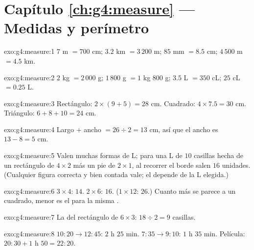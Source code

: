 \section*{Capítulo \ref{ch:g4:measure} --- Medidas y perímetro}

\begin{solution}{exo:g4:measure:1}
$7$ m $= 700$ cm; \quad $3.2$ km $= 3\,200$ m; \quad
$85$ mm $= 8.5$ cm; \quad $4\,500$ m $= 4.5$ km.
\end{solution}

\begin{solution}{exo:g4:measure:2}
$2$ kg $= 2\,000$ g; \quad $1\,800$ g $= 1$ kg $800$ g; \quad
$3.5$ L $= 350$ cL; \quad $25$ cL $= 0.25$ L.
\end{solution}

\begin{solution}{exo:g4:measure:3}
Rectángulo: $2 \times (9 + 5) = 28$ cm. Cuadrado:
$4 \times 7.5 = 30$ cm. Triángulo: $6 + 8 + 10 = 24$ cm.
\end{solution}

\begin{solution}{exo:g4:measure:4}
Largo $+$ ancho $= 26 \div 2 = 13$ cm, así que el ancho es
$13 - 8 = 5$ cm.
\end{solution}

\begin{solution}{exo:g4:measure:5}
Valen muchas formas de L; para una L de $10$ casillas hecha de un rectángulo
de $4 \times 2$ más un pie de $2 \times 1$, al recorrer el borde salen $16$
unidades. (Cualquier figura correcta y bien contada vale; el
 depende de la L elegida.)
\end{solution}

\begin{solution}{exo:g4:measure:6}
$3 \times 4$:  $14$. $2 \times 6$:  $16$.
($1 \times 12$:  $26$.) Cuanto más se parece a un cuadrado,
menor es el  para la misma .
\end{solution}

\begin{solution}{exo:g4:measure:7}
La  del rectángulo de $6 \times 3$: $18 \div 2 = 9$ casillas.
\end{solution}

\begin{solution}{exo:g4:measure:8}
$10{:}20 \to 12{:}45$: $2$ h $25$ min. $7{:}35 \to 9{:}10$:
$1$ h $35$ min. Película: $20{:}30 + 1$ h $50 = 22{:}20$.
\end{solution}

